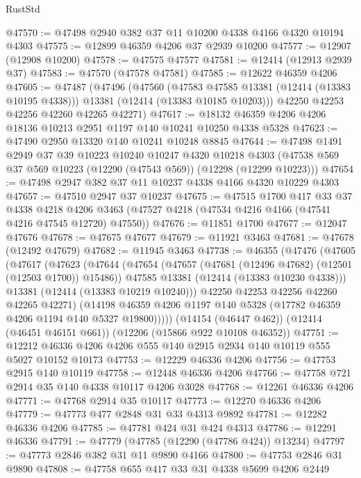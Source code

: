 \begin{lexlean}{RustStd}
\begin{coremodule}
{\begin{coremodule}
{{{{{{{{{{{{{{{{{{{{{{{{{{{{{{{{{{{{{{{{{{{{{{{{{{@47570 := @47498 @2940 @382 @37 @11 @10200 @4338 @4166 @4320 @10194 @4303
@47575 := @12899 @46359 @4206 @37 @2939 @10200
@47577 := @12907 (@12908 @10200)
@47578 := @47575 @47577
@47581 := @12414 (@12913 @2939 @37)
@47583 := @47570 (@47578 @47581)
@47585 := @12622 @46359 @4206
@47605 := @47487
    (@47496
      (@47560
        (@47583 @47585 @13381 (@12414 (@13383 @10195 @4338)))
        @13381
        (@12414 (@13383 @10185 @10203)))
      @42250
      @42253
      @42256
      @42260
      @42265
      @42271)
@47617 := @18132 @46359 @4206 @4206 @18136 @10213 @2951 @1197 @140 @10241 @10250 @4338 @5328
@47623 := @47490 @2950 @13320 @140 @10241 @10248 @8845
@47644 := @47498
    @1491
    @2949
    @37
    @39
    @10223
    @10240
    @10247
    @4320
    @10218
    @4303
    (@47538 @569 @37 @569 @10223 (@12290 (@47543 @569)) (@12298 (@12299 @10223)))
@47654 := @47498 @2947 @382 @37 @11 @10237 @4338 @4166 @4320 @10229 @4303
@47657 := @47510 @2947 @37 @10237
@47675 := @47515
    @1700
    @417
    @33
    @37
    @4338
    @4218
    @4206
    @3463
    (@47527 @4218 (@47534 @4216 @4166 (@47541 @4216 @47545 @12720) @47550))
@47676 := @11851 @1700
@47677 := @12047 @47676
@47678 := @47675 @47677
@47679 := @11921 @3463
@47681 := @47678 (@12492 @47679)
@47682 := @11945 @3463
@47738 := @46355
    (@47476
      (@47605
        (@47617
          (@47623
            (@47644
              (@47654
                (@47657 (@47681 (@12496 @47682) (@12501 (@12503 @1700)) @15486))
                @47585
                @13381
                (@12414 (@13383 @10230 @4338)))
              @13381
              (@12414 (@13383 @10219 @10240)))
            @42250
            @42253
            @42256
            @42260
            @42265
            @42271)
          (@14198 @46359 @4206 @1197 @140 @5328 (@17782 @46359 @4206 @1194 @140 @5327 @19800)))))
    (@14154 (@46447 @462))
    (@12414 (@46451 @46151 @661))
    (@12206 (@15866 @922 @10108 @46352))
@47751 := @12212 @46336 @4206 @4206 @555 @140 @2915 @2934 @140 @10119 @555 @5027 @10152 @10173
@47753 := @12229 @46336 @4206
@47756 := @47753 @2915 @140 @10119
@47758 := @12448 @46336 @4206
@47766 := @47758 @721 @2914 @35 @140 @4338 @10117 @4206 @3028
@47768 := @12261 @46336 @4206
@47771 := @47768 @2914 @35 @10117
@47773 := @12270 @46336 @4206
@47779 := @47773 @477 @2848 @31 @33 @4313 @9892
@47781 := @12282 @46336 @4206
@47785 := @47781 @424 @31 @424 @4313
@47786 := @12291 @46336
@47791 := @47779 (@47785 (@12290 (@47786 @424)) @13234)
@47797 := @47773 @2846 @382 @31 @11 @9890 @4166
@47800 := @47753 @2846 @31 @9890
@47808 := @47758 @655 @417 @33 @31 @4338 @5699 @4206 @2449
}}}}}}}}}}}}}}}}}}}}}}}}}}}}}}}}}}}}}}}}}}}}}}}}}}
\end{coremodule}}
\end{coremodule}
\end{lexlean}

